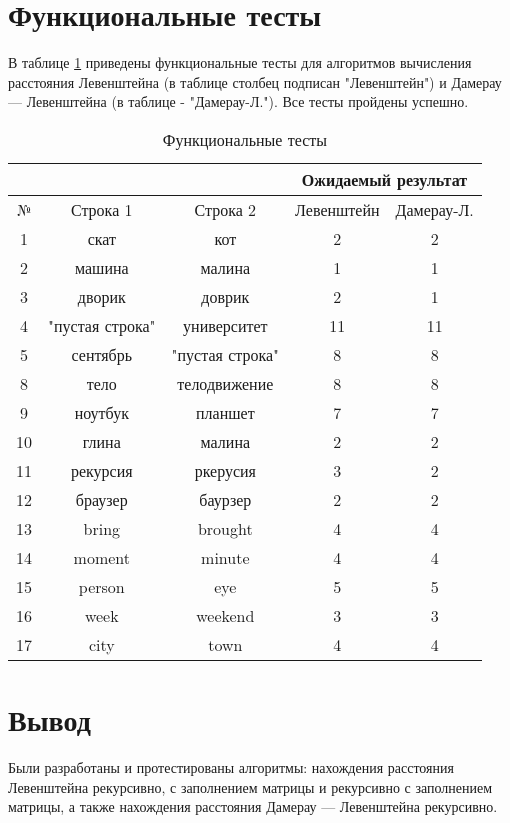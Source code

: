 \section{Функциональные тесты}
В таблице \ref{tabular:functional_test} приведены функциональные тесты для алгоритмов вычисления расстояния Левенштейна (в таблице столбец подписан "Левенштейн") и Дамерау — Левенштейна (в таблице - "Дамерау-Л."). Все тесты пройдены успешно.


\begin{table}[h]
	\begin{center}
		\caption{\label{tabular:functional_test} Функциональные тесты}
		\begin{tabular}{|c|c|c|c|c|}
			\hline
			& & & \multicolumn{2}{c|}{Ожидаемый результат} \\
			\hline
			№&Строка 1&Строка 2&Левенштейн&Дамерау-Л. \\
			\hline
			1&скат&кот&2&2 \\
			\hline
			2&машина&малина&1&1 \\
			\hline
			3&дворик&доврик&2&1 \\
			\hline
			4&"пустая строка"&университет&11&11 \\
			\hline
			5&сентябрь&"пустая строка"&8&8 \\
			\hline
			8&тело&телодвижение&8&8 \\
			\hline
			9&ноутбук&планшет&7&7 \\
			\hline
			10&глина&малина&2&2 \\
			\hline
			11&рекурсия&ркерусия&3&2 \\
			\hline
			12&браузер&баурзер&2&2 \\
			\hline
			13&bring&brought&4&4 \\
			\hline
			14&moment&minute&4&4 \\ 
			\hline
			15&person&eye&5&5 \\
			\hline
			16&week&weekend&3&3 \\
			\hline 
			17&city&town&4&4 \\
			\hline
		\end{tabular}
	\end{center}
\end{table}


\section*{Вывод}

Были разработаны и протестированы алгоритмы: нахождения расстояния Левенштейна рекурсивно, с заполнением матрицы и рекурсивно с заполнением матрицы, а также нахождения расстояния Дамерау — Левенштейна рекурсивно.

